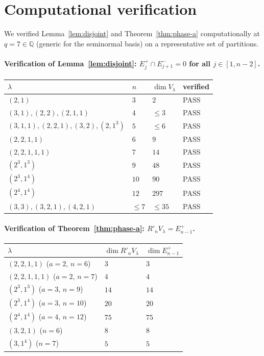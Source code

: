 \documentclass[11pt]{article}
\theoremstyle{definition}
\begin{document}
\section{Computational verification}\label{sec:verify}

We verified Lemma~\ref{lem:disjoint} and Theorem~\ref{thm:phase-a}
computationally at $q = 7 \in \mathbb{Q}$ (generic for the
seminormal basis) on a representative set of partitions.

\paragraph{Verification of Lemma~\ref{lem:disjoint}: $E_j^+ \cap
E_{j+1}^- = 0$ for all $j \in [1, n-2]$.}

\begin{center}
\begin{tabular}{llll}
\toprule
$\lambda$ & $n$ & $\dim V_\lambda$ & verified \\
\midrule
$(2,1)$ & $3$ & $2$ & PASS \\
$(3,1), (2,2), (2,1,1)$ & $4$ & $\le 3$ & PASS \\
$(3,1,1), (2,2,1), (3,2), (2,1^3)$ & $5$ & $\le 6$ & PASS \\
$(2,2,1,1)$ & $6$ & $9$ & PASS \\
$(2,2,1,1,1)$ & $7$ & $14$ & PASS \\
$(2^3, 1^3)$ & $9$ & $48$ & PASS \\
$(2^3, 1^4)$ & $10$ & $90$ & PASS \\
$(2^4, 1^4)$ & $12$ & $297$ & PASS \\
$(3,3), (3,2,1), (4,2,1)$ & $\le 7$ & $\le 35$ & PASS \\
\bottomrule
\end{tabular}
\end{center}

\paragraph{Verification of Theorem~\ref{thm:phase-a}: $R'_n V_\lambda
= E_{n-1}^+$.}

\begin{center}
\begin{tabular}{lll}
\toprule
$\lambda$ & $\dim R'_n V_\lambda$ & $\dim E_{n-1}^+$ \\
\midrule
$(2,2,1,1)$ ($a=2$, $n=6$) & $3$ & $3$ \\
$(2,2,1,1,1)$ ($a=2$, $n=7$) & $4$ & $4$ \\
$(2^3, 1^3)$ ($a=3$, $n=9$) & $14$ & $14$ \\
$(2^3, 1^4)$ ($a=3$, $n=10$) & $20$ & $20$ \\
$(2^4, 1^4)$ ($a=4$, $n=12$) & $75$ & $75$ \\
$(3,2,1)$ ($n=6$) & $8$ & $8$ \\
$(3, 1^4)$ ($n=7$) & $5$ & $5$ \\
\bottomrule
\end{tabular}
\end{center}
\end{document}
